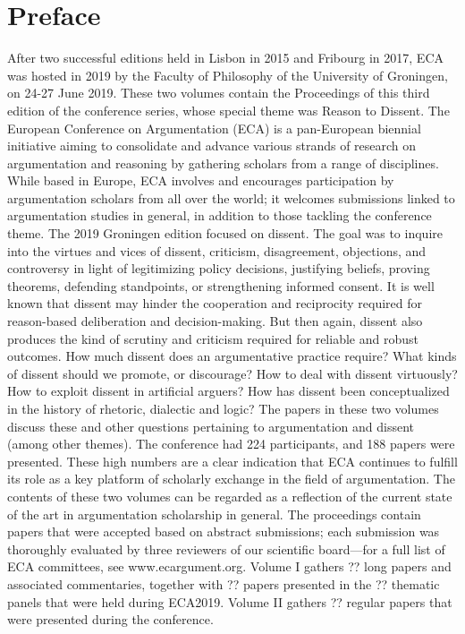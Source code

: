 \section*{Preface}

After two successful editions held in Lisbon in 2015 and Fribourg in 2017, ECA was hosted in 2019 by the Faculty of Philosophy of the University of Groningen, on 24-27 June 2019. These two volumes contain the Proceedings of this third edition of the conference series, whose special theme was Reason to Dissent.
The European Conference on Argumentation (ECA) is a pan-European biennial initiative aiming to consolidate and advance various strands of research on argumentation and reasoning by gathering scholars from a range of disciplines. While based in Europe, ECA involves and encourages participation by argumentation scholars from all over the world; it welcomes submissions linked to argumentation studies in general, in addition to those tackling the conference theme. The 2019 Groningen edition focused on dissent. The goal was to inquire into the virtues and vices of dissent, criticism, disagreement, objections, and controversy in light of legitimizing policy decisions, justifying beliefs, proving theorems, defending standpoints, or strengthening informed consent. It is well known that dissent may hinder the cooperation and reciprocity required for reason-based deliberation and decision-making. But then again, dissent also produces the kind of scrutiny and criticism required for reliable and robust outcomes. How much dissent does an argumentative practice require? What kinds of dissent should we promote, or discourage? How to deal with dissent virtuously? How to exploit dissent in artificial arguers? How has dissent been conceptualized in the history of rhetoric, dialectic and logic? The papers in these two volumes discuss these and other questions pertaining to argumentation and dissent (among other themes).
The conference had 224 participants, and 188 papers were presented. These high numbers are a clear indication that ECA continues to fulfill its role as a key platform of scholarly exchange in the field of argumentation. The contents of these two volumes can be regarded as a reflection of the current state of the art in argumentation scholarship in general.
The proceedings contain papers that were accepted based on abstract submissions; each submission was thoroughly evaluated by three reviewers of our scientific board—for a full list of ECA committees, see www.ecargument.org. Volume I gathers ?? long papers and associated commentaries, together with ?? papers presented in the ?? thematic panels that were held during ECA2019. Volume II gathers ?? regular papers that were presented during the conference. 
